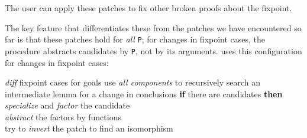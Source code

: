 The user can apply these patches to fix other broken proofs about the fixpoint.

The key feature that differentiates these from the patches we have encountered so far is that
these patches hold for \emph{all} \lstinline{P}; for changes in fixpoint cases, the procedure abstracts
candidates by \lstinline{P}, not by its arguments.
\sysname uses this configuration for changes in fixpoint cases:

\begin{algorithm}
\footnotesize
\begin{algorithmic}[1]
    \STATE \textit{diff} fixpoint cases for goals
    \STATE use \textit{all components} to recursively search an intermediate lemma for a change in conclusions
    \STATE \textbf{if} there are candidates \textbf{then}
    \STATE \hspace*{1em} \textit{specialize} and \textit{factor} the candidate \\
           \hspace*{1em} \textit{abstract} the factors by functions \\
           \hspace*{1em} try to \textit{invert} the patch to find an isomorphism 
\end{algorithmic}
\end{algorithm}




